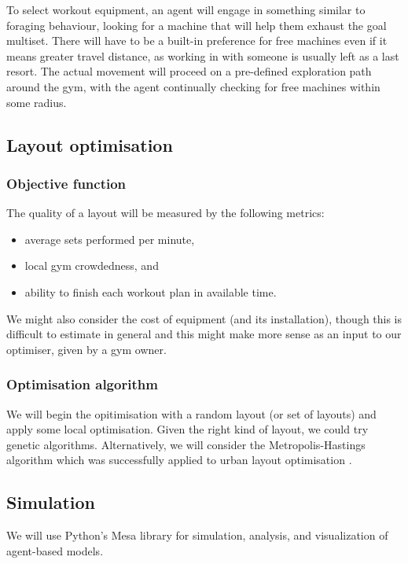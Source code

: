 \documentclass[9pt]{pnas-new}
\begin{document}
To select workout equipment, an agent will engage in something similar to foraging behaviour, looking for a machine that will help them exhaust the goal multiset. There will have to be a built-in preference for free machines even if it means greater travel distance, as working in with someone is usually left as a last resort.
The actual movement will proceed on a pre-defined exploration path around the gym, with the agent continually checking for free machines within some radius.


\subsection*{Layout optimisation}

\subsubsection*{Objective function}

The quality of a layout will be measured by the following metrics:
\begin{itemize}
	\item average sets performed per minute,
	\item local gym crowdedness, and
	\item ability to finish each workout plan in available time.
\end{itemize}
We might also consider the cost of equipment (and its installation), though this is difficult to estimate in general and this might make more sense as an input to our optimiser, given by a gym owner.

\subsubsection*{Optimisation algorithm}

We will begin the opitimisation with a random layout (or set of layouts) and apply some local optimisation. Given the right kind of layout, we could try genetic algorithms. Alternatively, we will consider the Metropolis-Hastings algorithm which was successfully applied to urban layout optimisation \cite{feng2016crowd_drive_layout_design,mathew2019urban_walkability}.


\subsection*{Simulation}

We will use Python's Mesa library for simulation, analysis, and visualization of agent-based models.
\end{document}
